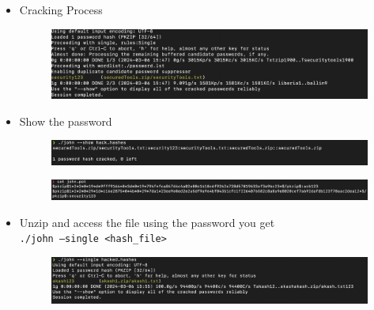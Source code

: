 \documentclass[12pt, A4Paper]{article}
\begin{document}
\begin{enumerate}
\begin{itemize}
        \item Cracking Process \\
         \begin{figure}[H]
            \centering
            \includegraphics[width=\textwidth]{images/3.png}
        \end{figure}
        \item Show the password \\
         \begin{figure}[H]
            \centering
            \includegraphics[width=\textwidth]{images/4.png}
        \end{figure}
         \begin{figure}[H]
            \centering
            \includegraphics{images/5.png}
        \end{figure}
        \item Unzip and access the file using the password you get \\
        \texttt 
        {./john --single <hash\_file>}\\ 
         \begin{figure}[H]
            \centering
            \includegraphics[width=\textwidth]{images/6.png}
        \end{figure}
    \end{itemize}
    \newpage


\end{enumerate}
\end{document}
